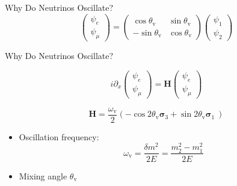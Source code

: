 \documentclass[9pt]{beamer}
\begin{document}
\begin{darkframes}
\begin{frame}{Why Do Neutrinos Oscillate?}
\begin{equation*}
\begin{pmatrix}
\psi_e\\
\psi_\mu
\end{pmatrix} = \begin{pmatrix}
\cos \theta_{\mathrm v} & \sin\theta_{\mathrm v} \\
-\sin \theta_{\mathrm v} & \cos \theta_{\mathrm v}
\end{pmatrix}\begin{pmatrix}
\psi_1\\
\psi_2
\end{pmatrix}
\end{equation*}

\end{frame}



\begin{frame}[fragile]{Why Do Neutrinos Oscillate?}





\begin{tcolorbox}[title=Equation of Motion, standard jigsaw, opacityback=0, coltext=white]

\begin{equation*}
i\partial_x \begin{pmatrix}
\psi_e\\
\psi_\mu
\end{pmatrix} = \mathbf{H}\begin{pmatrix}
\psi_e\\
\psi_\mu
\end{pmatrix}
\end{equation*}

\end{tcolorbox}

\pause

\begin{tcolorbox}[standard jigsaw, opacityback=0,coltext=white]
\begin{equation*}
\mathbf{H} = \frac{\omega_{\mathrm v} }{2}\left( - \cos 2\theta_{\mathrm v } \boldsymbol{\sigma}_3  + \sin 2\theta_{\mathrm{v}} \boldsymbol{\sigma}_1\ \right)
\end{equation*}


\begin{itemize}
    \item  Oscillation frequency:
\begin{equation*}
    \omega_{\mathrm v} = \frac{\delta m^2}{2E}=\frac{m_2^2 - m_1^2}{2E}
\end{equation*}
\item  Mixing angle $\theta_{\mathrm v}$
\end{itemize}



\end{tcolorbox}
\end{frame}
\end{darkframes}
\end{document}
